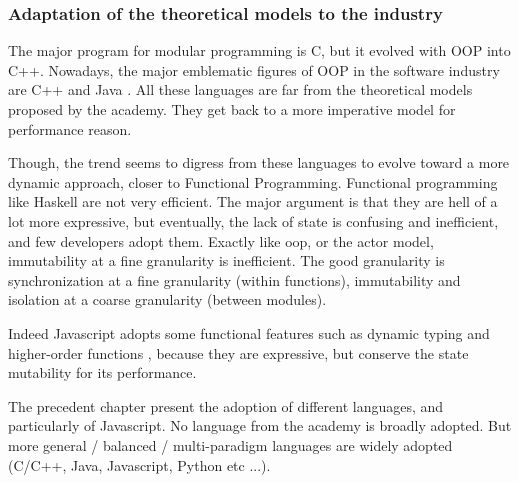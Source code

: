 \subsubsection{Adaptation of the theoretical models to the industry}

The major program for modular programming is C, but it evolved with OOP into C++.
Nowadays, the major emblematic figures of OOP in the software industry are C++ and Java \cite{Gosling2000,Stroustrup1986}.
All these languages are far from the theoretical models proposed by the academy.
They get back to a more imperative model for performance reason.

Though, the trend seems to digress from these languages to evolve toward a more dynamic approach, closer to Functional Programming.
Functional programming like Haskell are not very efficient.
The major argument is that they are hell of a lot more expressive, but eventually, the lack of state is confusing and inefficient, and few developers adopt them.
Exactly like oop, or the actor model, immutability at a fine granularity is inefficient.
The good granularity is synchronization at a fine granularity (within functions), immutability and isolation at a coarse granularity (between modules).

Indeed Javascript adopts some functional features such as dynamic typing and higher-order functions \cite{Ecma1999}, because they are expressive, but conserve the state mutability for its performance.

The precedent chapter present the adoption of different languages, and particularly of Javascript.
No language from the academy is broadly adopted.
But more general / balanced / multi-paradigm languages are widely adopted (C/C++, Java, Javascript, Python etc ...).






